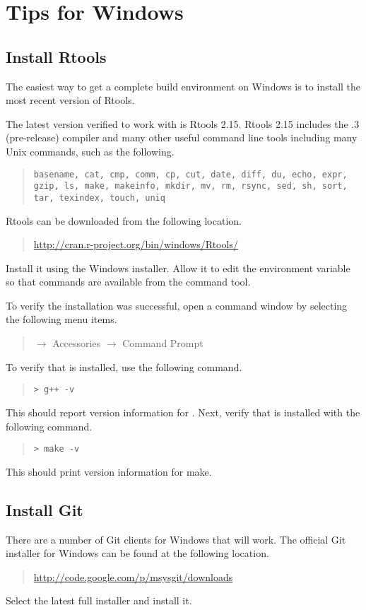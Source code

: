 \section{Tips for Windows}

\subsection{Install Rtools}

The easiest way to get a complete \Cpp build environment on Windows is
to install the most recent version of Rtools.  

The latest version verified to work with \Stan is Rtools 2.15.  Rtools
2.15 includes the .3 (pre-release) compiler and many other
useful command line tools including many Unix commands, such as the
following.
%
\begin{quote}
\tt basename, cat, cmp, comm, cp, cut, date,
diff, du, echo, expr, gzip, ls, make, makeinfo, mkdir, mv, rm, rsync,
sed, sh, sort, tar, texindex, touch, uniq
\end{quote}

Rtools can be downloaded from the following location.
%
\begin{quote}
  \url{http://cran.r-project.org/bin/windows/Rtools/}
\end{quote}
%
Install it using the Windows installer.  Allow it to edit the
 environment variable so that commands are available from
the command tool.

To verify the installation was successful, open a command window by
selecting the following menu items.
%
\begin{quote}
  $\rightarrow$ Accessories 
  $\rightarrow$ Command Prompt
\end{quote}
%
To verify that \gpp is installed, use the following command.
%
\begin{quote}
  \Verb|> g++ -v|
\end{quote}
%
This should report version information for \gpp.  Next, verify that
 is installed with the following command.
%
\begin{quote}
  \Verb|> make -v|
\end{quote}
%
This should print version information for make.

\subsection{Install Git}

There are a number of Git clients for Windows that will work.  The
official Git installer for Windows can be found at the following
location.
%
\begin{quote}
\url{http://code.google.com/p/msysgit/downloads}
\end{quote}
%
Select the latest full installer and install it. 

